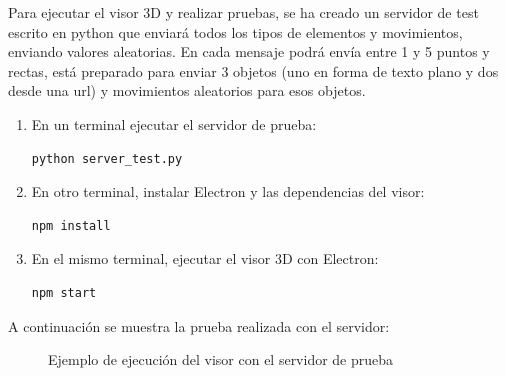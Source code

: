 Para ejecutar el visor 3D y realizar pruebas, se ha creado un servidor de test escrito en python que enviará todos los tipos de elementos y movimientos, enviando valores aleatorias. En cada mensaje podrá envía entre 1 y 5 puntos y rectas, está preparado para enviar 3 objetos (uno en forma de texto plano y dos desde una url) y movimientos aleatorios para esos objetos.

\begin{enumerate}
\item En un terminal ejecutar el servidor de prueba:
\begin{lstlisting}[frame=single]
python server_test.py
\end{lstlisting}
\item En otro terminal, instalar Electron y las dependencias del visor:
\begin{lstlisting}[frame=single]
npm install
\end{lstlisting}
\item En el mismo terminal, ejecutar el visor 3D con Electron:
\begin{lstlisting}[frame=single]
npm start
\end{lstlisting}
\end{enumerate}

A continuación se muestra la prueba realizada con el servidor:

\begin{figure}[H]
  \begin{center}
    \caption{Ejemplo de ejecución del visor con el servidor de prueba}
     \label{fig.ejemplo3dviz}
     \end{center}
\end{figure}












